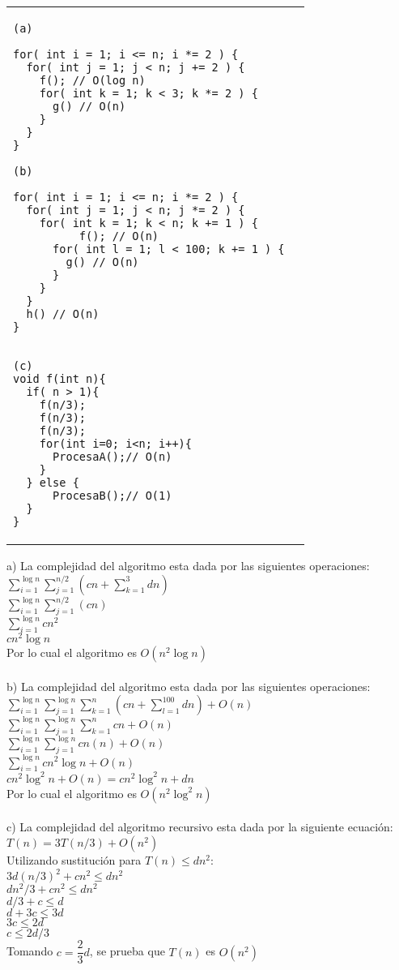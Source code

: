 \documentclass[10pt]{article}
\begin{document}
\begin{enumerate}
\begin{scriptsize}
\begin{tabular}{ll}
\begin{minipage}{3in}
\begin{verbatim}
(a)

for( int i = 1; i <= n; i *= 2 ) {
  for( int j = 1; j < n; j += 2 ) {
    f(); // O(log n)
    for( int k = 1; k < 3; k *= 2 ) {
      g() // O(n)
    }
  }
}

(b)

for( int i = 1; i <= n; i *= 2 ) {
  for( int j = 1; j < n; j *= 2 ) {
    for( int k = 1; k < n; k += 1 ) {
    	  f(); // O(n)
	  for( int l = 1; l < 100; k += 1 ) {
	    g() // O(n)
	  }
    }
  }
  h() // O(n)
}


(c)
void f(int n){
  if( n > 1){
    f(n/3);
    f(n/3);
    f(n/3);
    for(int i=0; i<n; i++){
      ProcesaA();// O(n)
    }
  } else {
      ProcesaB();// O(1)
  }
}
\end{verbatim}

\end{minipage}
\end{tabular}
\end{scriptsize}


a) La complejidad del algoritmo esta dada por las siguientes operaciones:\\
$\sum_{i=1}^{\log n}\sum_{j=1}^{n/2}(cn+\sum_{k=1}^{3}dn)$\\
$\sum_{i=1}^{\log n}\sum_{j=1}^{n/2}(cn)$\\$\sum_{i=1}^{\log n}cn^2$\\
$cn^2\log n$\\Por lo cual el algoritmo es $O(n^2\log n)$\\\\
b) La complejidad del algoritmo esta dada por las siguientes operaciones:\\
$\sum_{i=1}^{\log n}\sum_{j=1}^{\log n}\sum_{k=1}^{n}(cn+\sum_{l=1}^{100}dn)+O(n)$\\
$\sum_{i=1}^{\log n}\sum_{j=1}^{\log n}\sum_{k=1}^{n}cn+O(n)$\\
$\sum_{i=1}^{\log n}\sum_{j=1}^{\log n}cn(n)+O(n)$\\
$\sum_{i=1}^{\log n}cn^2\log n+O(n)$\\
$cn^2\log^2 n+O(n)=cn^2\log^2 n+dn$\\
Por lo cual el algoritmo es $O(n^2\log^2 n)$\\\\
c) La complejidad del algoritmo recursivo esta dada por la siguiente ecuación:\\
$T(n)=3T(n/3)+O(n^2)$\\Utilizando sustitución para $T(n)\leq dn^2$:\\
$3d(n/3)^2+cn^2\leq dn^2$\\$dn^2/3+cn^2\leq dn^2$\\$d/3+c\leq d$\\$d+3c\leq 3d$\\
$3c\leq 2d$\\$c\leq 2d/3$\\Tomando $c=\dfrac{2}{3}d$, se prueba que $T(n)$ es $O(n^2)$


\end{enumerate}
\end{document}
